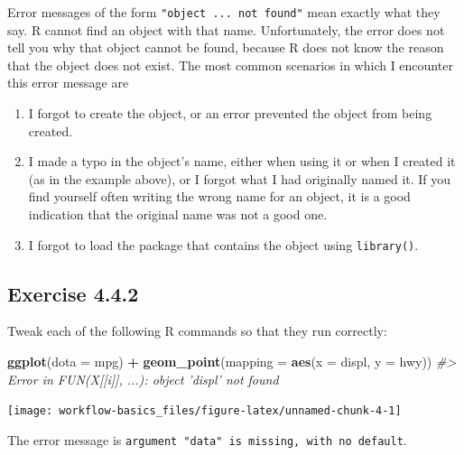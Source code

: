 \documentclass[]{book}
\newenvironment{Shaded}{\begin{snugshade}}{\end{snugshade}}
\newcommand{\CommentTok}[1]{\textcolor[rgb]{0.56,0.35,0.01}{\textit{#1}}}
\newcommand{\DataTypeTok}[1]{\textcolor[rgb]{0.13,0.29,0.53}{#1}}
\newcommand{\KeywordTok}[1]{\textcolor[rgb]{0.13,0.29,0.53}{\textbf{#1}}}
\newcommand{\NormalTok}[1]{#1}
\newcommand{\OperatorTok}[1]{\textcolor[rgb]{0.81,0.36,0.00}{\textbf{#1}}}
\newcommand{\StringTok}[1]{\textcolor[rgb]{0.31,0.60,0.02}{#1}}
\theoremstyle{plain}
\theoremstyle{remark}
\begin{document}
Error messages of the form \texttt{"object\ \textquotesingle{}...\textquotesingle{}\ not\ found"} mean exactly what they say.
R cannot find an object with that name.
Unfortunately, the error does not tell you why that object cannot be found, because R does not know the reason that the object does not exist.
The most common scenarios in which I encounter this error message are

\begin{enumerate}
\def\labelenumi{\arabic{enumi}.}
\item
  I forgot to create the object, or an error prevented the object from being created.
\item
  I made a typo in the object's name, either when using it or when I created it (as in the example above), or I forgot what I had originally named it.
  If you find yourself often writing the wrong name for an object,
  it is a good indication that the original name was not a good one.
\item
  I forgot to load the package that contains the object using \texttt{library()}.
\end{enumerate}

\hypertarget{exercise-4.4.2}{%
\subsection*{\texorpdfstring{Exercise {4.4.2}}{Exercise 4.4.2}}\label{exercise-4.4.2}}

Tweak each of the following R commands so that they run correctly:

\begin{Shaded}
\begin{Highlighting}[]
\KeywordTok{ggplot}\NormalTok{(}\DataTypeTok{dota =}\NormalTok{ mpg) }\OperatorTok{+}
\StringTok{  }\KeywordTok{geom_point}\NormalTok{(}\DataTypeTok{mapping =} \KeywordTok{aes}\NormalTok{(}\DataTypeTok{x =}\NormalTok{ displ, }\DataTypeTok{y =}\NormalTok{ hwy))}
\CommentTok{#> Error in FUN(X[[i]], ...): object 'displ' not found}
\end{Highlighting}
\end{Shaded}

\begin{center}\texttt{[image: workflow-basics\_files/figure-latex/unnamed-chunk-4-1]} \end{center}

The error message is \texttt{argument\ "data"\ is\ missing,\ with\ no\ default}.
\end{document}
